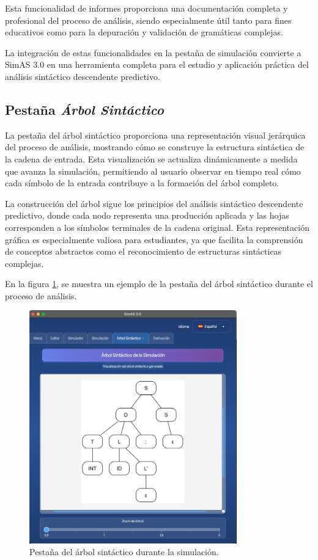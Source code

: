 Esta funcionalidad de informes proporciona una documentación completa y profesional del proceso de análisis, siendo especialmente útil tanto para fines educativos como para la depuración y validación de gramáticas complejas.

La integración de estas funcionalidades en la pestaña de simulación convierte a SimAS 3.0 en una herramienta completa para el estudio y aplicación práctica del análisis sintáctico descendente predictivo.


\subsection{Pestaña \textit{Árbol Sintáctico}}

La pestaña del árbol sintáctico proporciona una representación visual jerárquica del proceso de análisis, mostrando cómo se construye la estructura sintáctica de la cadena de entrada. Esta visualización se actualiza dinámicamente a medida que avanza la simulación, permitiendo al usuario observar en tiempo real cómo cada símbolo de la entrada contribuye a la formación del árbol completo.

La construcción del árbol sigue los principios del análisis sintáctico descendente predictivo, donde cada nodo representa una producción aplicada y las hojas corresponden a los símbolos terminales de la cadena original. Esta representación gráfica es especialmente valiosa para estudiantes, ya que facilita la comprensión de conceptos abstractos como el reconocimiento de estructuras sintácticas complejas.

En la figura \ref{fig:arbol_sintactico}, se muestra un ejemplo de la pestaña del árbol sintáctico durante el proceso de análisis.

\needspace{8cm}
\begin{figure}[H]
\centering
\includegraphics[width=0.8\textwidth]{figuras2/simulador/simulacion_arbol.png}
\caption{Pestaña del árbol sintáctico durante la simulación.}
\label{fig:arbol_sintactico}
\end{figure}

